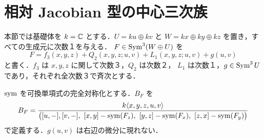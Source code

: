\section{相対 Jacobian 型の中心三次族}\label{sec:construction}
本節では基礎体を $k=\mathbb C$ とする．$U=ku\oplus kv$ と
$W=kx\oplus ky\oplus kz$ を置き，すべての生成元に次数１を与える．
$F\in\operatorname{Sym}^3(W\oplus U)$ を
\begin{equation}\label{eq:Ffull}
 F=f_3(x,y,z)+Q_2(x,y,z;u,v)+L_1(x,y,z;u,v)+g(u,v)
\end{equation}
と書く．$f_3$ は $x,y,z$ に関して次数３，$Q_2$ は次数２，
$L_1$ は次数１，$g\in\operatorname{Sym}^3U$ であり，それぞれ全次数３で斉次とする．

\begin{definition}\label{def:B}
$\operatorname{sym}$ を可換単項式の完全対称化とする．$B_F$ を
\begin{equation}\label{eq:B}
 B_F=\frac{k\langle x,y,z,u,v\rangle}{
 \bigl([u,-],[v,-],\ [x,y]-\operatorname{sym}(F_z),\
 [y,z]-\operatorname{sym}(F_x),\ [z,x]-\operatorname{sym}(F_y)\bigr)}
\end{equation}
で定義する．$g(u,v)$ は右辺の微分に現れない．
\end{definition}

